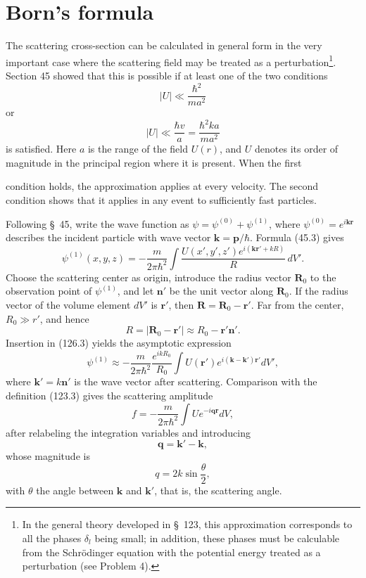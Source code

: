 \section{Born's formula}

The scattering cross-section can be calculated in general form in the very
important case where the scattering field may be treated as a
perturbation\footnote{In the general theory developed in \S~123, this
approximation corresponds to all the phases $\delta_l$ being small; in
addition, these phases must be calculable from the Schrödinger equation with
the potential energy treated as a perturbation (see Problem 4).}. Section 45
showed that this is possible if at least one of the two conditions
\begin{equation}
 |U|\ll\frac{\hbar^2}{ma^2}
 \tag{126.1}
\end{equation}
or
\begin{equation}
 |U|\ll\frac{\hbar v}{a}=\frac{\hbar^2ka}{ma^2}
 \tag{126.2}
\end{equation}
is satisfied. Here $a$ is the range of the field $U(r)$, and $U$ denotes its
order of magnitude in the principal region where it is present. When the first

condition holds, the approximation applies at every velocity. The second
condition shows that it applies in any event to sufficiently fast particles.

Following \S~45, write the wave function as
$\psi=\psi^{(0)}+\psi^{(1)}$, where $\psi^{(0)}=e^{i\mathbf{kr}}$ describes the
incident particle with wave vector $\mathbf k=\mathbf p/\hbar$. Formula (45.3)
gives
\begin{equation}
 \psi^{(1)}(x,y,z)=-\frac{m}{2\pi\hbar^2}\int
 \frac{U(x',y',z')e^{i(\mathbf{kr'}+kR)}}{R}\,dV'.
 \tag{126.3}
\end{equation}
Choose the scattering center as origin, introduce the radius vector
$\mathbf R_0$ to the observation point of $\psi^{(1)}$, and let $\mathbf n'$
be the unit vector along $\mathbf R_0$. If the radius vector of the volume
element $dV'$ is $\mathbf r'$, then $\mathbf R=\mathbf R_0-\mathbf r'$. Far
from the center, $R_0\gg r'$, and hence
\[
 R=|\mathbf R_0-\mathbf r'|\approx R_0-\mathbf r'\mathbf n'.
\]
Insertion in (126.3) yields the asymptotic expression
\[
 \psi^{(1)}\approx-\frac{m}{2\pi\hbar^2}\frac{e^{ikR_0}}{R_0}
 \int U(\mathbf r')e^{i(\mathbf k-\mathbf k')\mathbf r'}dV',
\]
where $\mathbf k'=k\mathbf n'$ is the wave vector after scattering. Comparison
with the definition (123.3) gives the scattering amplitude
\begin{equation}
 f=-\frac{m}{2\pi\hbar^2}\int Ue^{-i\mathbf{qr}}dV,
 \tag{126.4}
\end{equation}
after relabeling the integration variables and introducing
\begin{equation}
 \mathbf q=\mathbf k'-\mathbf k,
 \tag{126.5}
\end{equation}
whose magnitude is
\begin{equation}
 q=2k\sin\frac\theta2,
 \tag{126.6}
\end{equation}
with $\theta$ the angle between $\mathbf k$ and $\mathbf k'$, that is, the
scattering angle.

